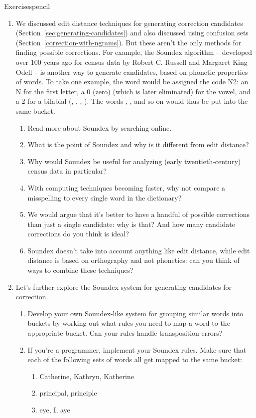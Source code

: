 \begin{tblsfilledsymbol}{Exercises}{pencil}
\begin{enumerate}
\item  We discussed edit distance techniques for generating correction candidates (Section~\ref{sec:generating-candidates}) and also discussed using confusion sets (Section~\ref{correction-with-ngrams}). But these aren't the only methods for finding possible corrections. For example, the Soundex algorithm -- developed over 100 years ago for census data by Robert C. Russell and Margaret King Odell \citep{russell:18} -- is another way to generate candidates, based on phonetic properties of words. To take one example, the word  would be assigned the code N2: an N for the first letter, a 0 (zero) (which is later eliminated) for the vowel, and a 2 for a bilabial (, , , ).  The words , , and so on would thus be put into the same bucket.
  \begin{enumerate}
  \item Read more about Soundex by searching online.
  \item What is the point of Soundex and why is it different from edit distance? 
  \item Why would Soundex be useful for analyzing (early twentieth-century) census data in particular?
  \item With computing techniques becoming faster, why not compare a misspelling to every single word in the dictionary?
  \item We would argue that it's better to have a handful of possible corrections than just a single candidate: why is that? And how many candidate corrections do you think is ideal?
  \item Soundex doesn't take into account anything like edit distance, while edit distance is based on orthography and not phonetics: can you think of ways to combine these techniques?
  \end{enumerate}

\item Let's further explore the Soundex system for generating candidates for correction.
 \begin{enumerate}
  \item Develop your own Soundex-like system for
    grouping similar words into buckets by working out what rules you
    need to map a word to the appropriate bucket.  Can your rules
    handle transposition errors?
  \item  If you're a programmer, implement your Soundex  rules.  Make sure that each of the following sets of words all get     mapped to the same bucket:
    \begin{enumerate}
    \item Catherine, Kathryn, Katherine
    \item principal, principle
    \item eye, I, aye
    \end{enumerate}
  \end{enumerate}
 \end{enumerate}

\end{tblsfilledsymbol}



